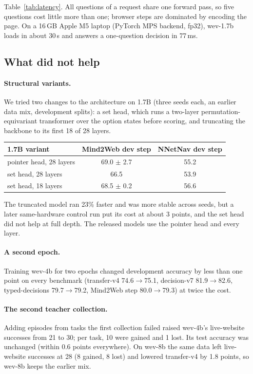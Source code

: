 \documentclass[11pt]{article}
\begin{document}
Table~\ref{tab:latency}. All questions of a request share one forward pass, so five questions cost little more than
one; browser steps are dominated by encoding the page. On a 16\,GB Apple M5 laptop (PyTorch MPS backend, fp32),
wev-1.7b loads in about 30\,s and answers a one-question decision in 77\,ms.

\subsection{What did not help}
\label{sec:ablations}

\paragraph{Structural variants.} We tried two changes to the architecture on 1.7B (three seeds each, an earlier data
mix, development splits): a set head, which runs a two-layer permutation-equivariant transformer over the option
states before scoring, and truncating the backbone to its first 18 of 28 layers.

\begin{center}\small
\begin{tabular}{lcc}
\toprule
1.7B variant & Mind2Web dev step & NNetNav dev step \\
\midrule
pointer head, 28 layers & 69.0 $\pm$ 2.7 & 55.2 \\
set head, 28 layers & 66.5 & 53.9 \\
set head, 18 layers & 68.5 $\pm$ 0.2 & 56.6 \\
\bottomrule
\end{tabular}
\end{center}
The truncated model ran 23\% faster and was more stable across seeds, but a later same-hardware control run put its
cost at about 3 points, and the set head did not help at full depth. The released models use the pointer head and
every layer.

\paragraph{A second epoch.} Training wev-4b for two epochs changed development accuracy by less than one point on every
benchmark (transfer-v4 74.6$\to$75.1, decision-v7 81.9$\to$82.6, typed-decisions 79.7$\to$79.2, Mind2Web step
80.0$\to$79.3) at twice the cost.

\paragraph{The second teacher collection.} Adding episodes from tasks the first collection failed raised wev-4b's
live-website successes from 21 to 30; per task, 10 were gained and 1 lost. Its test accuracy was unchanged (within 0.6
points everywhere). On wev-8b the same data left live-website successes at 28 (8 gained, 8 lost) and lowered
transfer-v4 by 1.8 points, so wev-8b keeps the earlier mix.
\end{document}
